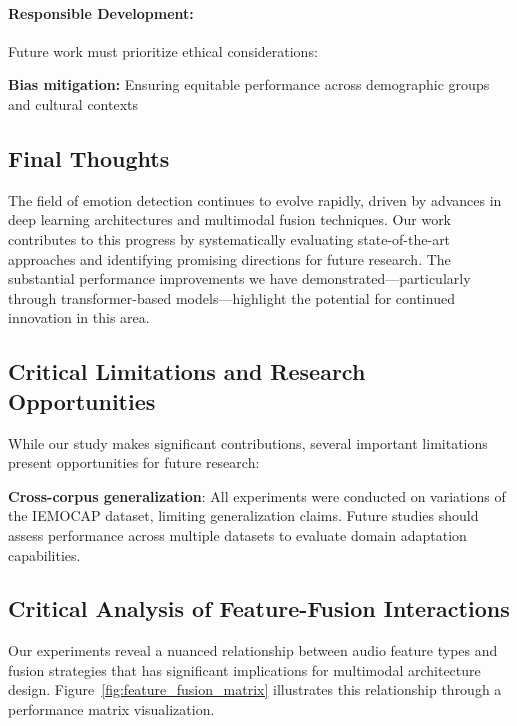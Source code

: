 \documentclass[12pt]{article}
\begin{document}
\paragraph{Responsible Development:}
Future work must prioritize ethical considerations:

    \item \textbf{Bias mitigation:} Ensuring equitable performance across demographic groups and cultural contexts

\subsection{Final Thoughts}
The field of emotion detection continues to evolve rapidly, driven by advances in deep learning architectures and multimodal fusion techniques. Our work contributes to this progress by systematically evaluating state-of-the-art approaches and identifying promising directions for future research. The substantial performance improvements we have demonstrated—particularly through transformer-based models—highlight the potential for continued innovation in this area.

\subsection{Critical Limitations and Research Opportunities}
While our study makes significant contributions, several important limitations present opportunities for future research:

    \item \textbf{Cross-corpus generalization}: All experiments were conducted on variations of the IEMOCAP dataset, limiting generalization claims. Future studies should assess performance across multiple datasets to evaluate domain adaptation capabilities.

\subsection{Critical Analysis of Feature-Fusion Interactions}
Our experiments reveal a nuanced relationship between audio feature types and fusion strategies that has significant implications for multimodal architecture design. Figure~\ref{fig:feature_fusion_matrix} illustrates this relationship through a performance matrix visualization.
\end{document}
